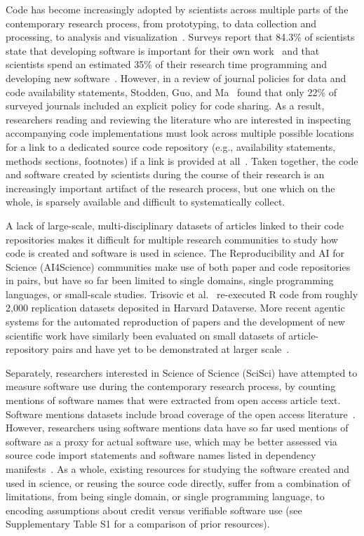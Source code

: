 \documentclass[pdflatex,sn-nature]{sn-jnl}%
\begin{document}
Code has become increasingly adopted by scientists across multiple parts of the contemporary research process, from prototyping, to data collection and processing, to analysis and visualization~\cite{hocquet2024software}. Surveys report that 84.3\% of scientists state that developing software is important for their own work~\cite{hannay2009scientists} and that scientists spend an estimated 35\% of their research time programming and developing new software~\cite{prabhu2011survey}. However, in a review of journal policies for data and code availability statements, Stodden, Guo, and Ma~\cite{stodden2013toward} found that only 22\% of surveyed journals included an explicit policy for code sharing. As a result, researchers reading and reviewing the literature who are interested in inspecting accompanying code implementations must look across multiple possible locations for a link to a dedicated source code repository (e.g., availability statements, methods sections, footnotes) if a link is provided at all~\cite{meyer2026papers,wattanakriengkrai2022github,lin2022automatic}. Taken together, the code and software created by scientists during the course of their research is an increasingly important artifact of the research process, but one which on the whole, is sparsely available and difficult to systematically collect.

A lack of large-scale, multi-disciplinary datasets of articles linked to their code repositories makes it difficult for multiple research communities to study how code is created and software is used in science. The Reproducibility and AI for Science (AI4Science) communities make use of both paper and code repositories in pairs, but have so far been limited to single domains, single programming languages, or small-scale studies. Trisovic et al.~\cite{trisovic2022large} re-executed R code from roughly 2,000 replication datasets deposited in Harvard Dataverse. More recent agentic systems for the automated reproduction of papers and the development of new scientific work have similarly been evaluated on small datasets of article-repository pairs and have yet to be demonstrated at larger scale~\cite{zhao2026autoreproduce,zhang2026paperrepro,shao2026sciscigpt}.

Separately, researchers interested in Science of Science (SciSci) have attempted to measure software use during the contemporary research process, by counting mentions of software names that were extracted from open access article text. Software mentions datasets include broad coverage of the open access literature~\cite{du2021softcite,schindler2021somesci,howison_2025_15149379}. However, researchers using software mentions data have so far used mentions of software as a proxy for actual software use, which may be better assessed via source code import statements and software names listed in dependency manifests~\cite{druskat2024dontmention,wu2026softwarespace,brown2026biomedical}. As a whole, existing resources for studying the software created and used in science, or reusing the source code directly, suffer from a combination of limitations, from being single domain, or single programming language, to encoding assumptions about credit versus verifiable software use (see Supplementary Table S1 for a comparison of prior resources).
\end{document}
